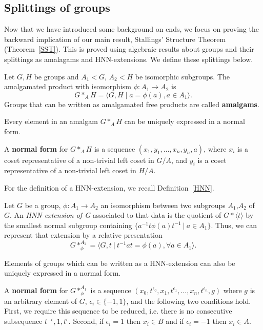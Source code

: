 \subsection{Splittings of groups}
Now that we have introduced some background on ends, we focus on proving the backward implication of our main result, Stallings' Structure Theorem (Theorem~\ref{SST}). This is proved using algebraic results about groups and their splittings as amalagams and HNN-extensions. We define these splittings below.

 \begin{definition}
     Let \(G,H\) be groups and \(A_1 < G\), \(A_2 < H\) be isomorphic subgroups. The amalgamated product with isomorphism \(\phi: A_1 \to A_2\) is 
     \[
     G *_A H = \langle G,H \mid a = \phi(a), a \in A_1 \rangle .
     \]
     Groups that can be written as amalgamated free products are called \textbf{amalgams}.
 \end{definition}

Every element in an amalgam \(G *_A H\) can be uniquely expressed in a normal form. 

\begin{definition}
    A \textbf{normal form} for \(G *_A H\) is a sequence \((x_1, y_1, \dots,x_n, y_n, a)\), where \(x_i\) is a coset representative of a non-trivial left coset in \(G/A\), and \(y_i\) is a coset representative of a non-trivial left coset in \(H/A\).
\end{definition}

For the definition of a HNN-extension, we recall Definition~\ref{HNN}.

 \begin{definition}
     Let $G$ be a group, $\phi: A_1 \to A_2$ an isomorphism between two subgroups $A_1$,$A_2$ of $G$. An \emph{HNN extension of G} associated to that data is the quotient of $G \ast \langle t \rangle$ by the smallest normal subgroup containing $\{a^{-1}t\phi(a)t^{-1} \: | \: a \in A_1 \}$. Thus, we can represent that extension by a relative presentation 
    \[G \ast_\phi^{A_1} = \langle G,t \: | \: t^{-1}at = \phi(a), \forall a \in A_1 \rangle. \]
 \end{definition}

Elements of groups which can be written as a HNN-extension can also be uniquely expressed in a normal form.

\begin{definition}
    A \textbf{normal form} for \(G \ast_\phi^{A_1}\) is a sequence \((x_0, t^{\epsilon_0}, x_1, t^{\epsilon_1}, \dots, x_n, t^{\epsilon_n}, g)\) where \(g\) is an arbitrary element of \(G\), \(\epsilon_i \in \{-1, 1\}\), and the following two conditions hold. First, we require this sequence to be reduced, i.e. there is no consecutive subsequence \(t^{-\epsilon}, 1, t^{\epsilon}\). Second, if \(\epsilon_i =1\) then \(x_i \in B\) and if \(\epsilon_i = -1\) then \(x_i \in A\).
\end{definition}

